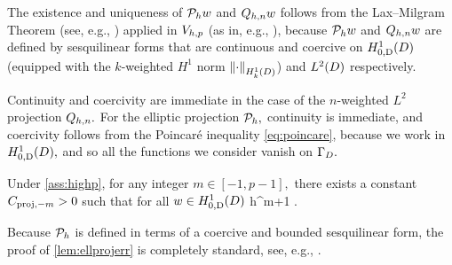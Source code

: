 The existence and uniqueness of $\mathcal P_{h} w$ and $Q_{h,n} w$ follows from the Lax--Milgram Theorem (see, e.g., \cite[Theorem 2.7.7]{BrSc:08}) applied in $V_{h,p}$ (as in, e.g., \cite[Corollary 2.7.13]{BrSc:08}), because $\mathcal P_{h} w$ and $Q_{h,n} w$ are defined by sesquilinear forms that are continuous and coercive on $\HozDD$ (equipped with the $k$-weighted $H^1$ norm $\NHokD{\cdot}$) and $\LtD$ respectively.

Continuity and coercivity are immediate in the case of the $n$-weighted $L^2$ projection $Q_{h,n}.$ For the elliptic projection $\mathcal P_{h},$ continuity is immediate, and coercivity follows from the Poincar\'e inequality \cref{eq:poincare}, because we work in $\HozDD,$ and so all the functions we consider vanish on $\Gamma_{D}.$
\epf

\label{lem:ellprojerr}
Under \cref{ass:highp}, for any integer $m \in [-1,p-1],$ there exists a constant $C_{\mathrm{proj},-m} >0$ such that for all $w \in \HozDD$
\beq\label{eq:ellprojerr}
 \leq \Cmmo h^{m+1} .
\eeq
\ele

Because $\mathcal P_{h}$ is defined in terms of a coercive and bounded sesquilinear form, the proof of \cref{lem:ellprojerr} is completely standard, see, e.g., \cite[Theorem 5.8.3]{BrSc:08}.

\label{lem:ellprojerrw}

\


